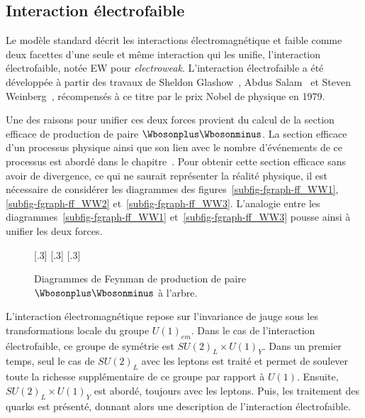 \subsection{Interaction électrofaible}\label{chapter-MS-MSSM-section-formalisme-subsec-EW}
Le modèle standard décrit les interactions électromagnétique et faible comme deux facettes d'une seule et même interaction qui les unifie, l'interaction électrofaible, notée \og EW \fg{} pour \emph{electroweak}.
L'interaction électrofaible a été développée à partir des travaux de Sheldon Glashow~\cite{Glashow_EW}, Abdus Salam~\cite{Salam_EW} et Steven Weinberg~\cite{Weinberg_leptons_model}, récompensés à ce titre par le prix Nobel de physique en 1979.
\par Une des raisons pour unifier ces deux forces provient du calcul de la section efficace de production de paire $\Wbosonplus\Wbosonminus$.
La section efficace d'un processus physique ainsi que son lien avec le nombre d'événements de ce processus est abordé dans le chapitre~.
Pour obtenir cette section efficace sans avoir de divergence, ce qui ne saurait représenter la réalité physique, il est nécessaire de considérer les diagrammes des figures~\ref{subfig-fgraph-ff_WW1}, \ref{subfig-fgraph-ff_WW2} et~\ref{subfig-fgraph-ff_WW3}. L'analogie entre les diagrammes~\ref{subfig-fgraph-ff_WW1} et~\ref{subfig-fgraph-ff_WW3} pousse ainsi à unifier les deux forces.
\begin{figure}[h]
\centering
\vspace{\baselineskip}
\subcaptionbox{\label{subfig-fgraph-ff_WW1}}[.3\textwidth]
{\vspace{\baselineskip}}
\hfill
\subcaptionbox{\label{subfig-fgraph-ff_WW2}}[.3\textwidth]
{\vspace{\baselineskip}}
\hfill
\subcaptionbox{\label{subfig-fgraph-ff_WW3}}[.3\textwidth]
{\vspace{\baselineskip}}

\caption{Diagrammes de Feynman de production de paire $\Wbosonplus\Wbosonminus$ à l'arbre.}
\label{fig-fgraph-ff_WW}
\end{figure}
\par L'interaction électromagnétique repose sur l'invariance de jauge sous les transformations locale du groupe $U(1)_{em}$.
Dans le cas de l'interaction électrofaible, ce groupe de symétrie est $SU(2)_L \times U(1)_Y$. Dans un premier temps, seul le cas de $SU(2)_L$ avec les leptons est traité et permet de soulever toute la richesse supplémentaire de ce groupe par rapport à $U(1)$. Ensuite, $SU(2)_L \times U(1)_Y$ est abordé, toujours avec les leptons. Puis, les traitement des quarks est présenté, donnant alors une description de l'interaction électrofaible.
